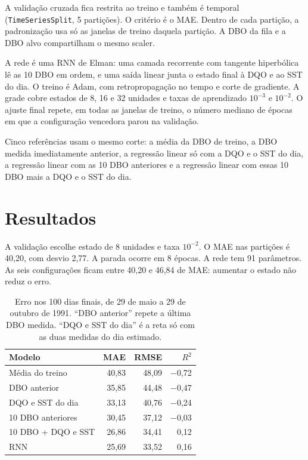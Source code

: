 \documentclass[11pt,a4paper]{article}
\begin{document}
A validação cruzada fica restrita ao treino e também é temporal (\texttt{TimeSeriesSplit}, 5 partições). O critério é o MAE. Dentro de cada partição, a padronização usa só as janelas de treino daquela partição. A DBO da fila e a DBO alvo compartilham o mesmo scaler.

A rede é uma RNN de Elman: uma camada recorrente com tangente hiperbólica lê as 10 DBO em ordem, e uma saída linear junta o estado final à DQO e ao SST do dia. O treino é Adam, com retropropagação no tempo e corte de gradiente. A grade cobre estados de 8, 16 e 32 unidades e taxas de aprendizado \(10^{-3}\) e \(10^{-2}\). O ajuste final repete, em todas as janelas de treino, o número mediano de épocas em que a configuração vencedora parou na validação.

Cinco referências usam o mesmo corte: a média da DBO de treino, a DBO medida imediatamente anterior, a regressão linear só com a DQO e o SST do dia, a regressão linear com as 10 DBO anteriores e a regressão linear com essas 10 DBO mais a DQO e o SST do dia.

\section{Resultados}

A validação escolhe estado de 8 unidades e taxa \(10^{-2}\). O MAE nas partições é 40,20, com desvio 2,77. A parada ocorre em 8 épocas. A rede tem 91 parâmetros. As seis configurações ficam entre 40,20 e 46,84 de MAE: aumentar o estado não reduz o erro.

\begin{table}[H]
\centering
\caption{Erro nos 100 dias finais, de 29 de maio a 29 de outubro de 1991. ``DBO anterior'' repete a última DBO medida. ``DQO e SST do dia'' é a reta só com as duas medidas do dia estimado.}
\begin{tabular}{lrrr}
\toprule
Modelo & MAE & RMSE & \(R^{2}\) \\
\midrule
Média do treino & 40,83 & 48,09 & $-$0,72 \\
DBO anterior & 35,85 & 44,48 & $-$0,47 \\
DQO e SST do dia & 33,13 & 40,76 & $-$0,24 \\
10 DBO anteriores & 30,45 & 37,12 & $-$0,03 \\
10 DBO + DQO e SST & 26,86 & 34,41 & 0,12 \\
RNN & 25,69 & 33,52 & 0,16 \\
\bottomrule
\end{tabular}
\end{table}
\end{document}
